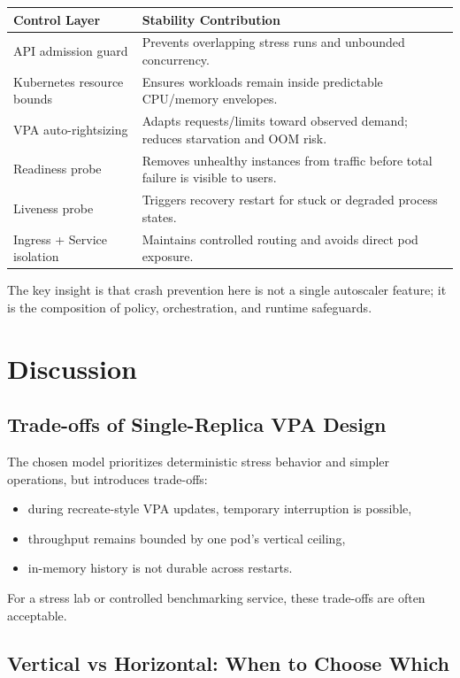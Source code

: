 \documentclass[11pt,a4paper]{article}
\begin{document}
\begin{longtable}{@{}p{} p{}@{}}
\toprule
\textbf{Control Layer} & \textbf{Stability Contribution} \\
\midrule
API admission guard & Prevents overlapping stress runs and unbounded concurrency. \\
Kubernetes resource bounds & Ensures workloads remain inside predictable CPU/memory envelopes. \\
VPA auto-rightsizing & Adapts requests/limits toward observed demand; reduces starvation and OOM risk. \\
Readiness probe & Removes unhealthy instances from traffic before total failure is visible to users. \\
Liveness probe & Triggers recovery restart for stuck or degraded process states. \\
Ingress + Service isolation & Maintains controlled routing and avoids direct pod exposure. \\
\bottomrule
\end{longtable}

The key insight is that crash prevention here is not a single autoscaler feature; it is the composition of policy, orchestration, and runtime safeguards.

\section{Discussion}

\subsection{Trade-offs of Single-Replica VPA Design}
The chosen model prioritizes deterministic stress behavior and simpler operations, but introduces trade-offs:

\begin{itemize}[leftmargin=1.5em]
	\item during recreate-style VPA updates, temporary interruption is possible,
	\item throughput remains bounded by one pod's vertical ceiling,
	\item in-memory history is not durable across restarts.
\end{itemize}

For a stress lab or controlled benchmarking service, these trade-offs are often acceptable.

\subsection{Vertical vs Horizontal: When to Choose Which}
\end{document}
